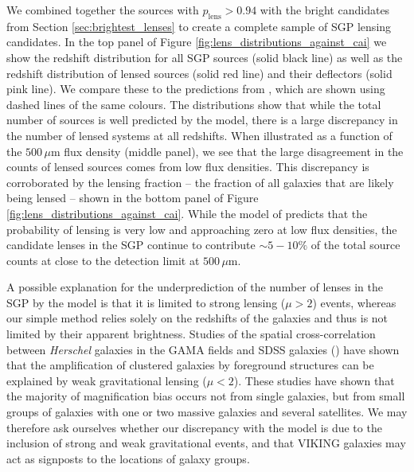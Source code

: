 We combined together the sources with $p_{\textrm{lens}} > 0.94$ with the bright candidates from Section \ref{sec:brightest_lenses} to create a complete sample of SGP lensing candidates. In the top panel of Figure \ref{fig:lens_distributions_against_cai} we show the redshift distribution for all SGP sources (solid black line) as well as the redshift distribution of lensed sources (solid red line) and their deflectors (solid pink line). We compare these to the predictions from \citealt{Cai_2013}, which are shown using dashed lines of the same colours. The distributions show that while the total number of sources is well predicted by the model, there is a large discrepancy in the number of lensed systems at all redshifts. When illustrated as a function of the $500\,\mu$m flux density (middle panel), we see that the large disagreement in the counts of lensed sources comes from low flux densities. This discrepancy is corroborated by the lensing fraction -- the fraction of all galaxies that are likely being lensed -- shown in the bottom panel of Figure \ref{fig:lens_distributions_against_cai}. While the model of \citealt{Cai_2013} predicts that the probability of lensing is very low and approaching zero at low flux densities, the candidate lenses in the SGP continue to contribute $\sim 5 - 10\%$ of the total source counts at close to the detection limit at $500\,\mu$m.

A possible explanation for the underprediction of the number of lenses in the SGP by the \citealt{Cai_2013} model is that it is limited to strong lensing ($\mu > 2$) events, whereas our simple method relies solely on the redshifts of the galaxies and thus is not limited by their apparent brightness. Studies of the spatial cross-correlation between \textit{Herschel} galaxies in the GAMA fields and SDSS galaxies (\citealt{Gonzalez-Nuevo_2014, Gonzalez-Nuevo_2017}) have shown that the amplification of clustered galaxies by foreground structures can be explained by weak gravitational lensing ($\mu < 2$). These studies have shown that the majority of magnification bias occurs not from single galaxies, but from small groups of galaxies with one or two massive galaxies and several satellites. We may therefore ask ourselves whether our discrepancy with the \citealt{Cai_2013} model is due to the inclusion of strong and weak gravitational events, and that VIKING galaxies may act as signposts to the locations of galaxy groups.

